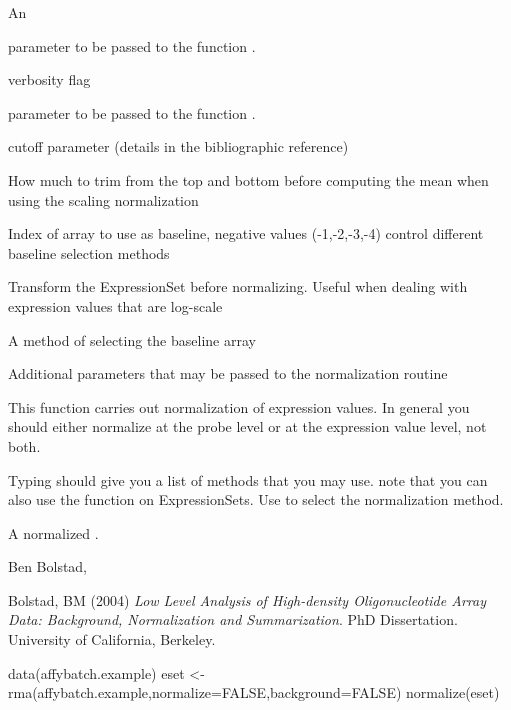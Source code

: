 \begin{Arguments}
\begin{ldescription}
\item[\code{eset}] An 
\item[\code{span}] parameter to be passed to the function .
\item[\code{choose.subset}] 
\item[\code{subset.size}] 
\item[\code{verbose}] verbosity flag
\item[\code{family}] parameter to be passed to the function
.
\item[\code{prd.td}] cutoff parameter (details in the bibliographic
reference)
\item[\code{trim}] How much to trim from the top and bottom before computing
the mean when using the scaling normalization
\item[\code{baseline}] Index of array to use as baseline, negative values
(-1,-2,-3,-4) control different baseline selection methods
\item[\code{transfn}] Transform the ExpressionSet before normalizing. Useful when
dealing with expression values that are log-scale
\item[\code{baseline.type}] A method of selecting the baseline array
\item[\code{...}] Additional parameters that may be passed to the
normalization routine
\end{ldescription}
\end{Arguments}
\begin{Details}\relax
This function carries out normalization of expression values. In
general you should either normalize at the probe level or at the
expression value level, not both.

Typing  should give you a list of
methods that you may use. note that you can also use the
 function on ExpressionSets. Use  to select the
normalization method.
\end{Details}
\begin{Value}
A normalized .
\end{Value}
\begin{Author}\relax
Ben Bolstad, 
\end{Author}
\begin{References}\relax
Bolstad, BM (2004) \emph{Low Level Analysis of High-density
Oligonucleotide Array Data: Background, Normalization and
Summarization}. PhD Dissertation. University of California,
Berkeley.
\end{References}
\begin{SeeAlso}\relax
{}
\end{SeeAlso}
\begin{Examples}
\begin{ExampleCode}
data(affybatch.example)
eset <- rma(affybatch.example,normalize=FALSE,background=FALSE)
normalize(eset)
\end{ExampleCode}
\end{Examples}

